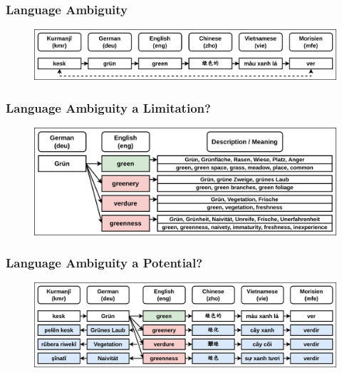 \documentclass[aspectratio=169]{beamer}
\begin{document}
\begin{frame}[fragile]
\end{frame}



\begin{frame}[fragile]
	\frametitle{Language Ambiguity}
    \begin{figure}
        \centering
        \includegraphics[width=1.0\textwidth]{images/CRAMT-Tool-WordAlignmentExample.png} 
    \end{figure}
\end{frame}

\begin{frame}[fragile]
	\frametitle{Language Ambiguity a Limitation?}
    \begin{figure}
        \centering
        \includegraphics[width=1.0\textwidth]{images/CRAMT-Tool-WordAlignmentLimitation.png} 
    \end{figure}
\end{frame}

\begin{frame}[fragile]
	\frametitle{Language Ambiguity a Potential?}
    \begin{figure}
        \centering
        \includegraphics[width=1.0\textwidth]{images/CRAMT-Tool-WordAlignmentLimitationExample.png} 
    \end{figure}
\end{frame}
\end{document}
